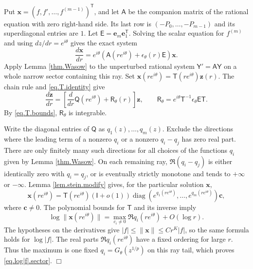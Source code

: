 \documentclass[a4paper,12pt]{article}
\newenvironment{proof}
{\noindent{\it Proof.}}{\hfill $\Box$\par\vspace{2.5mm}}
\numberwithin{equation}{section}
\begin{document}
\begin{proof}
Put $\bm x=(f,f',\ldots,f^{(m-1)})^{\mathsf T}$, and let $\mathsf{A}$
be the companion matrix of the rational equation with zero right-hand side.
Its last row is $(-P_0,\ldots,-P_{m-1})$ and its superdiagonal entries are $1$.
Let $\mathsf{E}=\bm e_m\bm e_1^{\mathsf T}$. Solving the scalar equation for
$f^{(m)}$ and using $dz/dr=e^{i\theta}$ gives the exact system
\begin{equation}\label{eq.ray.companion}
 \frac{d\bm x}{dr}=e^{i\theta}(\mathsf{A}(re^{i\theta})
                                 +\epsilon_\theta(r)\mathsf{E})\bm x.
\end{equation}
Apply Lemma \ref{thm.Wasow} to the unperturbed rational system
$\mathsf{Y}'=\mathsf{A}\mathsf{Y}$ on a whole narrow sector containing this ray.
Set $\bm x(re^{i\theta})=\mathsf{T}(re^{i\theta})\bm z(r)$.
The chain rule and \eqref{eq.T.identity} give
\begin{equation}\label{eq.ray.gauge}
 \frac{d\bm z}{dr}=
 \left[\frac d{dr}\mathsf{Q}(re^{i\theta})+\mathsf{R}_\theta(r)\right]\bm z,
 \qquad
 \mathsf{R}_\theta=e^{i\theta}\mathsf{T}^{-1}\epsilon_\theta\mathsf{E}\mathsf{T}.
\end{equation}
By \eqref{eq.T.bounds}, $\mathsf{R}_\theta$ is integrable.

Write the diagonal entries of $\mathsf{Q}$ as $q_1(z),\ldots,q_m(z)$.
Exclude the directions where the leading term of a nonzero $q_i$
or a nonzero $q_i-q_j$ has zero real part.
There are only finitely many such directions for all choices of the
functions $q_i$ given by Lemma \ref{thm.Wasow}.
On each remaining ray, $\Re(q_i-q_j)$ is either identically zero
with $q_i=q_j$, or is eventually strictly monotone and tends to
$+\infty$ or $-\infty$.
Lemma \ref{lem.stein.modify} gives, for the particular solution $\bm x$,
\[
 \bm x(re^{i\theta})=
 \mathsf{T}(re^{i\theta})(\mathsf{I}+o(1))
 \operatorname{diag}(e^{q_1(re^{i\theta})},\ldots,e^{q_m(re^{i\theta})})\bm c,
\]
where $\bm c\ne0$.
The polynomial bounds for $\mathsf{T}$ and its inverse imply
\[
 \log\|\bm x(re^{i\theta})\|
 =\max_{c_i\ne0}\Re q_i(re^{i\theta})+O(\log r).
\]
The hypotheses on the derivatives give
$|f|\le\|\bm x\|\le Cr^K|f|$, so the same formula holds for $\log|f|$.
The real parts $\Re q_i(re^{i\theta})$ have a fixed ordering for large $r$.
Thus the maximum is one fixed $q_i=G_\theta(z^{1/p})$ on this ray tail,
which proves \eqref{eq.log|f|.sector}.
\end{proof}
\end{document}
